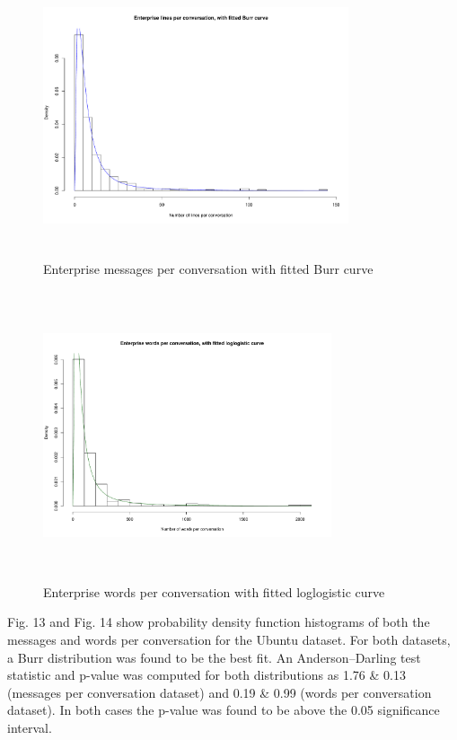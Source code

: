 \documentclass[conference]{IEEEtran}
\begin{document}
\begin{figure}
\begin{center}
\includegraphics[height=8.3cm, width=9cm]{11_messages_enterprise.pdf} 
\caption{Enterprise messages per conversation with fitted Burr curve}
\end{center}
\label{fig:interarrival_ent}
\end{figure}

\begin{figure}
\begin{center}
\includegraphics[height=8.5cm, width=8.5cm]{12_words_enterprise.pdf} 
\caption{Enterprise words per conversation with fitted loglogistic curve}
\end{center}
\label{fig:interarrival_ent}
\end{figure}

Fig. 13 and Fig. 14 show probability density function histograms of both the messages and words per conversation for the Ubuntu dataset. 
For both datasets, a Burr distribution was found to be the best fit. An Anderson--Darling test statistic and p-value was computed for both distributions as 1.76 \& 0.13 (messages per conversation dataset) and 0.19 \&  0.99 (words per conversation dataset). In both cases the p-value was found to be above the 0.05 significance interval.
\end{document}
